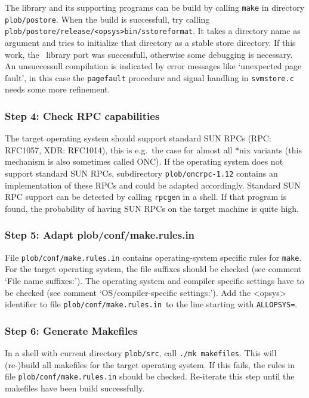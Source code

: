 The library and its supporting programs can be build by calling
\texttt{make} in directory \texttt{plob/postore}. When the build is
successfull, try calling
\texttt{plob/postore/release/<opsys>bin/sstoreformat}. It takes a
directory name as argument and tries to initialize that directory as a
stable store directory. If this work, the \postore\ library port was
successfull, otherwise some debugging is necessary. An unsuccessull
compilation is indicated by error messages like `unexpected page
fault', in this case the \texttt{page\us{}fault} procedure and signal
handling in \texttt{svmstore.c} needs some more refinement.

\subsubsection{Step 4: Check RPC capabilities}

The target operating system should support standard SUN RPCs (RPC:
RFC1057, XDR: RFC1014), this is e.g.\ the case for almost all *nix
variants (this mechanism is also sometimes called ONC). If the
operating system does not support standard SUN RPCs, subdirectory
\texttt{plob/oncrpc-1.12} contains an implementation of these RPCs and
could be adapted accordingly. Standard SUN RPC support can be detected
by calling \texttt{rpcgen} in a shell. If that program is found, the
probability of having SUN RPCs on the target machine is quite high.

\subsubsection{Step 5: Adapt plob/conf/make.rules.in}

File \texttt{plob/conf/make.rules.in} contains operating-system
specific rules for \texttt{make}. For the target operating system, the
file suffixes should be checked (see comment `File name suffixes:').
The operating system and compiler specific settings have to be checked
(see comment `OS/compiler-specific settings:'). Add the <opsys>
identifier to file \texttt{plob/conf/make.rules.in}\ to the line
starting with \texttt{ALLOPSYS=}.

\subsubsection{Step 6: Generate Makefiles}

In a shell with current directory \texttt{plob/src}, call \texttt{./mk
  makefiles}. This will (re-)build all makefiles for the target
operating system. If this fails, the rules in file
\texttt{plob/conf/make.rules.in} should be checked. Re-iterate this
step until the makefiles have been build successfully.

